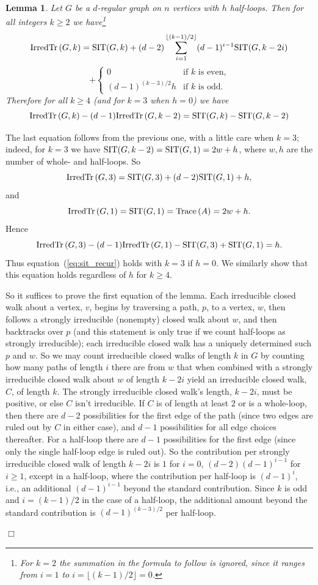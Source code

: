 \documentclass[12pt]{article}
\newtheorem{lemma}[theorem]{Lemma}
\newcommand{\sit}{{\rm SIT}}
\newcommand{\irdtr}[2]{{\rm IrredTr}\left(#1,#2\right)}
\newcommand{\proof}{{\par\noindent {\bf Proof}\space\space}}
\newcommand{\proofbox}{\begin{flushright}$\Box$\end{flushright}}
\newcommand{\Trace}[1]{{\rm Trace}\left( #1 \right) }
\begin{document}
\begin{lemma}\label{lm:main_sit}
Let $G$ be a $d$-regular graph on $n$ vertices with $h$ half-loops.
Then for all
integers $k\ge 2$ we have\footnote{
	For $k=2$ the summation in the formula to follow is ignored, since it
	ranges from $i=1$ to $i=\lfloor(k-1)/2\rfloor=0$.
}
$$
\irdtr{G}{k} = \sit(G,k)+(d-2)\sum_{i=1}^{\lfloor(k-1)/2\rfloor}(d-1)^{i-1}
\sit(G,k-2i)
$$
$$
+ \left\{\begin{array}{ll} 0 & \mbox{if $k$ is even,}\\ (d-1)^{(k-3)/2}h &
\mbox{if $k$ is odd.} \end{array}\right.
$$
Therefore for all $k\ge 4$ (and for $k=3$ when $h=0$) we have
\begin{equation}\label{eq:sit_recur}
\irdtr{G}{k}-(d-1)\irdtr{G}{k-2} = \sit(G,k)-\sit(G,k-2)
\end{equation}
\end{lemma}
\proof
The last equation follows from the previous one, with a little care
when $k=3$; indeed, for $k=3$ we have $\sit(G,k-2)=\sit(G,1)=2w+h$,
where $w,h$ are the number of whole- and half-loops.
So
$$
\irdtr{G}{3}=\sit(G,3)+(d-2)\sit(G,1)+h,
$$
and
$$
\irdtr{G}{1}=\sit(G,1)=\Trace{A} = 2w+h.
$$
Hence
$$
\irdtr{G}{3}-(d-1)\irdtr{G}{1}-\sit(G,3)+\sit(G,1)=h.
$$
Thus equation~(\ref{eq:sit_recur}) holds with $k=3$ if $h=0$.
We similarly show that this equation holds regardless of $h$ for $k\ge 4$.

So it suffices to prove the first equation of the lemma.
Each irreducible closed walk about a vertex, $v$, begins by traversing a
path, $p$, to a vertex, $w$,
then follows a strongly irreducible (nonempty)
closed walk about $w$, and then backtracks
over $p$ (and this statement is only true
if we count half-loops as strongly irreducible); each irreducible closed walk
has a uniquely determined such $p$ and $w$.
So we may count irreducible closed walks of length $k$ in $G$ by counting how
many paths of length $i$ there are from $w$ that when combined with
a strongly irreducible closed walk about $w$
of length $k-2i$ yield an irreducible closed walk, $C$, of length $k$.  
The strongly irreducible closed walk's length, $k-2i$, must be positive, or
else $C$ isn't irreducible.
If $C$
is of length at least $2$ or is a whole-loop, then there are
$d-2$ possibilities for the first edge of the path (since two edges are
ruled out by $C$ in either case), and $d-1$ possibilities for all edge
choices thereafter.  For a half-loop there are $d-1$ possibilities for 
the first edge (since only the single half-loop edge is ruled out).
So the contribution per strongly irreducible closed walk of length $k-2i$
is $1$ for $i=0$, $(d-2)(d-1)^{i-1}$ for $i\ge 1$, except in a half-loop,
where the contribution per half-loop is $(d-1)^i$, i.e., an additional
$(d-1)^{i-1}$ beyond the standard contribution.  Since $k$ is odd and
$i=(k-1)/2$ in the case of a half-loop, the additional amount beyond
the standard contribution is $(d-1)^{(k-3)/2}$ per half-loop.
\proofbox
\end{document}
